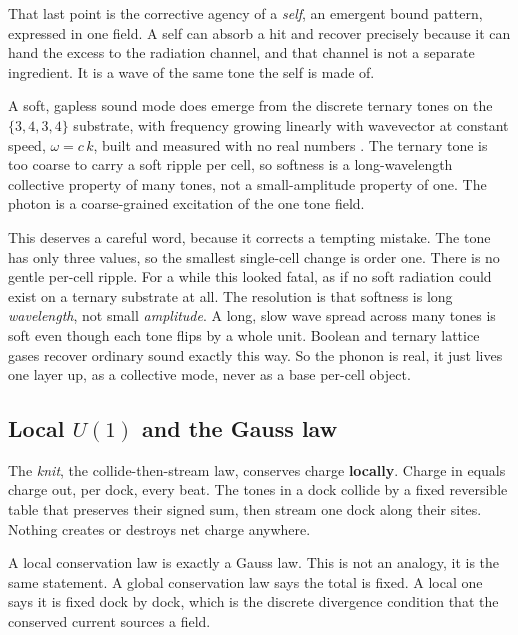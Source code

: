 That last point is the corrective agency of a \emph{self}, an emergent bound pattern, expressed in one field. A self can absorb a hit and recover precisely because it can hand the excess to the radiation channel, and that channel is not a separate ingredient. It is a wave of the same tone the self is made of.

\begin{result}
A soft, gapless sound mode does emerge from the discrete ternary tones on the $\{3,4,3,4\}$ substrate, with frequency growing linearly with wavevector at constant speed, $\omega = c\,k$, built and measured with no real numbers \cite{pollard2026vibetest}. The ternary tone is too coarse to carry a soft ripple per cell, so softness is a long-wavelength collective property of many tones, not a small-amplitude property of one. The photon is a coarse-grained excitation of the one tone field.
\end{result}

This deserves a careful word, because it corrects a tempting mistake. The tone has only three values, so the smallest single-cell change is order one. There is no gentle per-cell ripple. For a while this looked fatal, as if no soft radiation could exist on a ternary substrate at all. The resolution is that softness is long \emph{wavelength}, not small \emph{amplitude}. A long, slow wave spread across many tones is soft even though each tone flips by a whole unit. Boolean and ternary lattice gases recover ordinary sound exactly this way. So the phonon is real, it just lives one layer up, as a collective mode, never as a base per-cell object.

\subsection{Local $U(1)$ and the Gauss law}

The \emph{knit}, the collide-then-stream law, conserves charge \textbf{locally}. Charge in equals charge out, per dock, every beat. The tones in a dock collide by a fixed reversible table that preserves their signed sum, then stream one dock along their sites. Nothing creates or destroys net charge anywhere.

A local conservation law is exactly a Gauss law. This is not an analogy, it is the same statement. A global conservation law says the total is fixed. A local one says it is fixed dock by dock, which is the discrete divergence condition that the conserved current sources a field.

